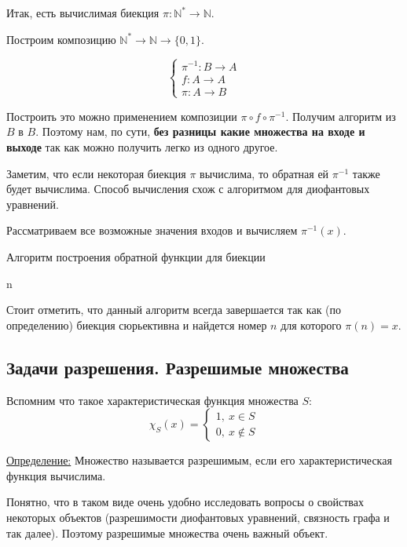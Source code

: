 \documentclass[a4paper, 12pt]{article}
\newcommand{\definition}{\underline{Определение:} }
\newcommand{\N}{\mathbb{N}}
\begin{document}
Итак, есть вычислимая биекция $\pi: \N^* \to \N$.

Построим композицию $\N^* \to \N \to \{0, 1\}$.

\[
    \begin{cases}
        \pi^{-1}: B \to A \\
        f: A \to A \\
        \pi: A \to B
    \end{cases}
\]

Построить это можно применением композиции  $\pi \circ f \circ \pi^{-1}$. Получим алгоритм из $B$ в $B$. 
Поэтому нам, по сути, \textbf{без разницы какие множества на входе
и выходе} так как можно получить легко из одного другое.



Заметим, что если некоторая биекция $\pi$ вычислима, то обратная ей $\pi^{-1}$ также будет вычислима. Способ вычисления схож с алгоритмом для диофантовых уравнений.

Рассматриваем все возможные значения входов и вычисляем $\pi^{-1}(x)$.
\begin{algorithm}
\caption{Алгоритм построения обратной функции для биекции}
\begin{algorithmic}[1]
            \State \Return n
        \EndIf
    \EndFor
\EndFunction
\end{algorithmic}
\end{algorithm}

Стоит отметить, что данный алгоритм всегда завершается так как
(по определению) биекция сюрьективна и найдется номер $n$ для
которого $\pi(n) = x$.

\subsection*{Задачи разрешения. Разрешимые множества}

Вспомним что такое характеристическая функция множества $S$:
\[
\chi_S(x) = \begin{cases}
    1,\ x \in S \\
    0,\ x \notin S
\end{cases}
\]

\definition{Множество называется разрешимым, если его
характеристическая функция вычислима.}

Понятно, что в таком виде очень удобно исследовать вопросы о
свойствах некоторых объектов (разрешимости диофантовых уравнений,
связность графа и так далее). Поэтому разрешимые множества
очень важный объект.
\end{document}
